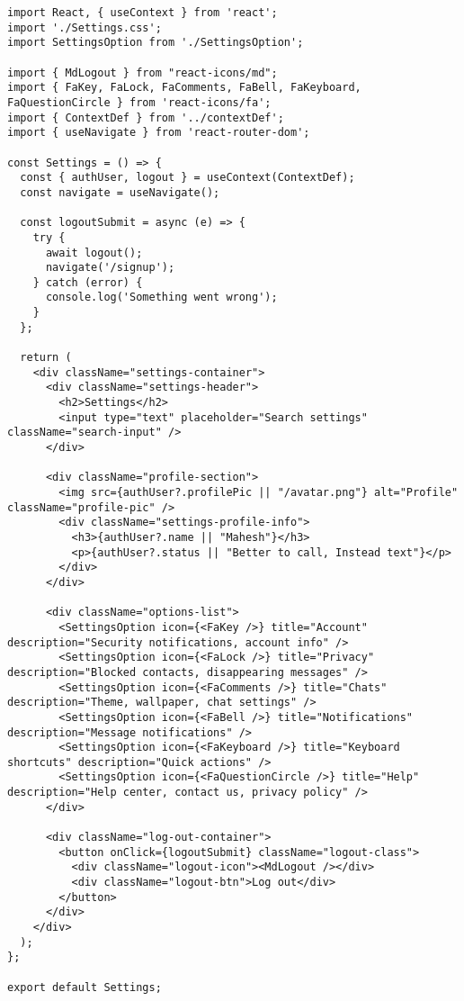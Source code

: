 \documentclass[12pt,a4paper]{report}
\begin{document}
\begin{lstlisting}
import React, { useContext } from 'react';
import './Settings.css';
import SettingsOption from './SettingsOption';

import { MdLogout } from "react-icons/md";
import { FaKey, FaLock, FaComments, FaBell, FaKeyboard, FaQuestionCircle } from 'react-icons/fa';
import { ContextDef } from '../contextDef';
import { useNavigate } from 'react-router-dom';

const Settings = () => {
  const { authUser, logout } = useContext(ContextDef);
  const navigate = useNavigate();

  const logoutSubmit = async (e) => {
    try {
      await logout();
      navigate('/signup');
    } catch (error) {
      console.log('Something went wrong');
    }
  };

  return (
    <div className="settings-container">
      <div className="settings-header">
        <h2>Settings</h2>
        <input type="text" placeholder="Search settings" className="search-input" />
      </div>

      <div className="profile-section">
        <img src={authUser?.profilePic || "/avatar.png"} alt="Profile" className="profile-pic" />
        <div className="settings-profile-info">
          <h3>{authUser?.name || "Mahesh"}</h3>
          <p>{authUser?.status || "Better to call, Instead text"}</p>
        </div>
      </div>

      <div className="options-list">
        <SettingsOption icon={<FaKey />} title="Account" description="Security notifications, account info" />
        <SettingsOption icon={<FaLock />} title="Privacy" description="Blocked contacts, disappearing messages" />
        <SettingsOption icon={<FaComments />} title="Chats" description="Theme, wallpaper, chat settings" />
        <SettingsOption icon={<FaBell />} title="Notifications" description="Message notifications" />
        <SettingsOption icon={<FaKeyboard />} title="Keyboard shortcuts" description="Quick actions" />
        <SettingsOption icon={<FaQuestionCircle />} title="Help" description="Help center, contact us, privacy policy" />
      </div>

      <div className="log-out-container">
        <button onClick={logoutSubmit} className="logout-class">
          <div className="logout-icon"><MdLogout /></div>
          <div className="logout-btn">Log out</div>
        </button>
      </div>
    </div>
  );
};

export default Settings;
\end{lstlisting}
\end{document}
